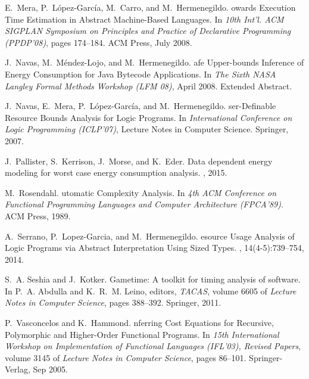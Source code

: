 \documentclass{llncs}
\begin{document}
\begin{thebibliography}{10}
E.~Mera, P.~L\'{o}pez-Garc\'{i}a, M.~Carro, and M.~Hermenegildo.
owards {E}xecution {T}ime {E}stimation in {A}bstract
  {M}achine-{B}ased {L}anguages.
\newblock In {\em 10th Int'l. ACM SIGPLAN Symposium on Principles and Practice
  of Declarative Programming (PPDP'08)}, pages 174--184. ACM Press, July 2008.

J.~Navas, M.~M\'{e}ndez-Lojo, and M.~Hermenegildo.
afe {U}pper-bounds {I}nference of {E}nergy {C}onsumption for
  {J}ava {B}ytecode {A}pplications.
\newblock In {\em The Sixth NASA Langley Formal Methods Workshop (LFM 08)},
  April 2008.
\newblock Extended Abstract.

J.~Navas, E.~Mera, P.~L\'{o}pez-Garc\'{i}a, and M.~Hermenegildo.
ser-{D}efinable {R}esource {B}ounds {A}nalysis for {L}ogic
  {P}rograms.
\newblock In {\em International Conference on Logic Programming (ICLP'07)},
  Lecture Notes in Computer Science. Springer, 2007.

J.~Pallister, S.~Kerrison, J.~Morse, and K.~Eder.
\newblock Data dependent energy modeling for worst case energy consumption
  analysis.
, 2015.

M.~Rosendahl.
utomatic {C}omplexity {A}nalysis.
\newblock In {\em 4th ACM {C}onference on {F}unctional {P}rogramming
  {L}anguages and {C}omputer {A}rchitecture (FPCA'89)}. ACM Press, 1989.

A.~Serrano, P.~Lopez-Garcia, and M.~Hermenegildo.
esource {U}sage {A}nalysis of {L}ogic {P}rograms via {A}bstract
  {I}nterpretation {U}sing {S}ized {T}ypes.
, 14(4-5):739--754, 2014.

S.~A. Seshia and J.~Kotker.
\newblock Gametime: A toolkit for timing analysis of software.
\newblock In P.~A. Abdulla and K.~R.~M. Leino, editors, {\em TACAS}, volume
  6605 of {\em Lecture Notes in Computer Science}, pages 388--392. Springer,
  2011.

P.~Vasconcelos and K.~Hammond.
nferring {C}ost {E}quations for {R}ecursive, {P}olymorphic and
  {H}igher-{O}rder {F}unctional {P}rograms.
\newblock In {\em 15th International Workshop on Implementation of Functional
  Languages (IFL'03), Revised Papers}, volume 3145 of {\em Lecture Notes in
  Computer Science}, pages 86--101. Springer-Verlag, Sep 2005.


\end{thebibliography}
\end{document}
